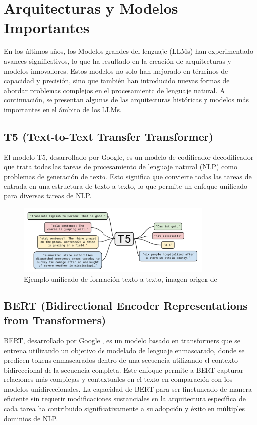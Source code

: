 \section{Arquitecturas y Modelos Importantes}
En los últimos años, los Modelos grandes del lenguaje (LLMs) han experimentado avances significativos, lo que ha resultado en la creación de arquitecturas y modelos innovadores. Estos modelos no solo han mejorado en términos de capacidad y precisión, sino que también han introducido nuevas formas de abordar problemas complejos en el procesamiento de lenguaje natural. A continuación, se presentan algunas de las arquitecturas históricas y modelos más importantes en el ámbito de los LLMs.

\subsection{T5 (Text-to-Text Transfer Transformer)}
El modelo T5, desarrollado por Google, es un modelo de codificador-decodificador que trata todas las tareas de procesamiento de lenguaje natural (NLP) como problemas de generación de texto. Esto significa que convierte todas las tareas de entrada en una estructura de texto a texto, lo que permite un enfoque unificado para diversas tareas de NLP.

\begin{figure}[h]
\centering
\includegraphics[width=0.85\textwidth]{figuras/capitulo1/t5.png}
\caption{Ejemplo unificado de formación texto a texto, imagen origen de \citep{raffel2020exploring}}
\label{fig:t5}
\end{figure}

\subsection{BERT (Bidirectional Encoder Representations from Transformers)}
BERT, desarrollado por Google \citep{devlin2018bert}, es un modelo basado en transformers que se entrena utilizando un objetivo de modelado de lenguaje enmascarado, donde se predicen tokens enmascarados dentro de una secuencia utilizando el contexto bidireccional de la secuencia completa. Este enfoque permite a BERT capturar relaciones más complejas y contextuales en el texto en comparación con los modelos unidireccionales. La capacidad de BERT para ser finetuneado de manera eficiente sin requerir modificaciones sustanciales en la arquitectura específica de cada tarea ha contribuido significativamente a su adopción y éxito en múltiples dominios de NLP.

